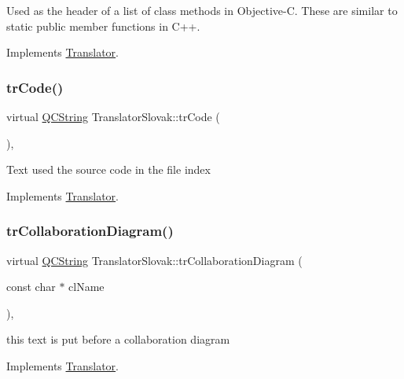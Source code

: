 Used as the header of a list of class methods in Objective-\/C. These are similar to static public member functions in C++. 

Implements \mbox{\hyperlink{class_translator}{Translator}}.

\mbox{\label{class_translator_slovak_a8ff07ec7b931c538ae73f0e65b34abfc}} 
\subsubsection{\texorpdfstring{trCode()}{trCode()}}
{\footnotesize\ttfamily virtual \mbox{\hyperlink{class_q_c_string}{Q\+C\+String}} Translator\+Slovak\+::tr\+Code (\begin{DoxyParamCaption}{ }\end{DoxyParamCaption})\hspace{0.3cm}{\ttfamily [inline]}, {\ttfamily [virtual]}}

Text used the source code in the file index 

Implements \mbox{\hyperlink{class_translator}{Translator}}.

\mbox{\label{class_translator_slovak_a9d864b98795f5f3ee523d5bbfa4559b8}} 
\subsubsection{\texorpdfstring{trCollaborationDiagram()}{trCollaborationDiagram()}}
{\footnotesize\ttfamily virtual \mbox{\hyperlink{class_q_c_string}{Q\+C\+String}} Translator\+Slovak\+::tr\+Collaboration\+Diagram (\begin{DoxyParamCaption}\item[{const char $\ast$}]{cl\+Name }\end{DoxyParamCaption})\hspace{0.3cm}{\ttfamily [inline]}, {\ttfamily [virtual]}}

this text is put before a collaboration diagram 

Implements \mbox{\hyperlink{class_translator}{Translator}}.

\mbox{\label{class_translator_slovak_acb5cf54f3018c5d73d6b456fef99ec44}} 
